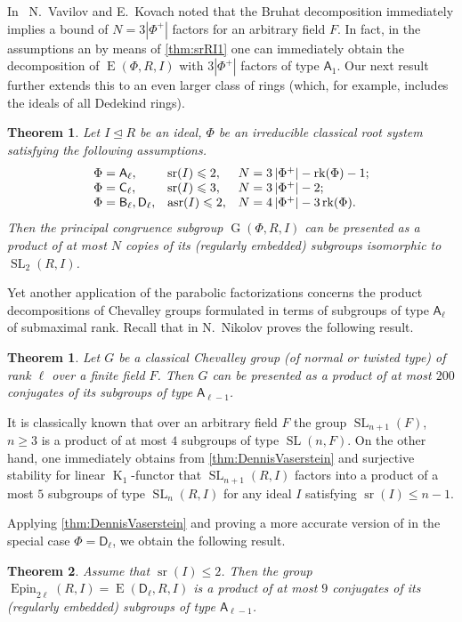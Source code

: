 \documentclass[oneside, 12pt]{amsart}
\theoremstyle{plain}
\newtheorem{thm}{Theorem}
\numberwithin{equation}{section}
\numberwithin{lemma}{section}
\newtheorem*{thm*}{Theorem}
\theoremstyle{definition}
\theoremstyle{remark}
\DeclareMathOperator{\K}{K}
\DeclareMathOperator{\G}{G}
\DeclareMathOperator{\SL}{SL}
\DeclareMathOperator{\E}{E}
\DeclareMathOperator{\sr}{sr}
\DeclareMathOperator{\asr}{asr}
\DeclareMathOperator{\Epin}{Epin}
\DeclareMathOperator{\rk}{rk}
\newcommand{\rA}{\mathsf{A}}
\newcommand{\rB}{\mathsf{B}}
\newcommand{\rC}{\mathsf{C}}
\newcommand{\rD}{\mathsf{D}}
\begin{document}
In~\cite{V13} N.~Vavilov and E.~Kovach noted that the Bruhat decomposition immediately implies a bound of $N=3|\Phi^+|$ factors for an arbitrary field $F$.
In fact, in the assumptions an by means of \cref{thm:srRI1} one can immediately obtain the decomposition of $\E(\Phi, R, I)$ with $3|\Phi^+|$ factors of type $\rA_1$.
Our next result further extends this to an even larger class of rings (which, for example, includes the ideals of all Dedekind rings).
\begin{thm}\label{thm:SL2width}
Let $I\trianglelefteq R$ be an ideal, $\Phi$ be an irreducible classical root system satisfying the following assumptions.
\[\begin{array}{l@{\quad}l@{\quad}l}
\Phi=\rA_\ell, & \sr(I)\leqslant 2, & N=3\left|\Phi^+\right| - \rk(\Phi) - 1; \\
\Phi=\rC_\ell, & \sr(I)\leqslant 3, & N=3\left|\Phi^+\right| - 2; \\
\Phi=\rB_\ell, \rD_\ell, & \asr(I)\leqslant 2, & N=4\left|\Phi^+\right| - 3\rk(\Phi).
\end{array}\]
Then the principal congruence subgroup $\G(\Phi, R, I)$ can be presented as a product of at most $N$ copies of its (regularly embedded) subgroups isomorphic to $\SL_2(R, I)$.
\end{thm}

Yet another application of the parabolic factorizations concerns the product decompositions of Chevalley groups formulated in terms of subgroups of type $\rA_\ell$ of submaximal rank.
Recall that in \cite{Nik07} N.~Nikolov proves the following result. 
\begin{thm*} Let $G$ be a classical Chevalley group (of normal or twisted type) of rank $\ell$ over a finite field $F$.
Then $G$ can be presented as a product of at most $200$ conjugates of its subgroups of type $\rA_{\ell-1}$. \end{thm*}

It is classically known that over an arbitrary field $F$ the group $\SL_{n+1}(F)$, $n\geq 3$ is a product of at most $4$ subgroups of type $\SL(n, F)$.
On the other hand, one immediately obtains from \cref{thm:DennisVaserstein} and surjective stability for linear $\K_1$-functor that $\SL_{n+1}(R, I)$ factors into a product
of a most $5$ subgroups of type $\SL_n(R, I)$ for any ideal $I$ satisfying $\sr(I)\leqslant n-1$.

Applying \cref{thm:DennisVaserstein} and proving a more accurate version of \cite[Proposition~1]{Nik07} in the special case $\Phi=\rD_\ell$, we obtain the following result.
\begin{thm}\label{thm:spin-sln-prod}
Assume that $\sr(I) \leqslant 2$. Then the group $\Epin_{2\ell}(R, I)=\E(\rD_\ell, R, I)$ is a product of at most $9$ conjugates of its (regularly embedded) subgroups of type $\rA_{\ell-1}$.
\end{thm}
\end{document}
